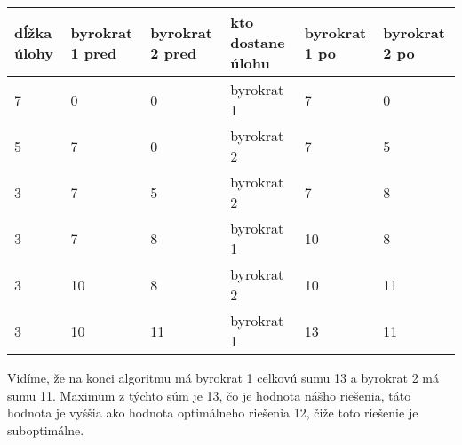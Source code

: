 \documentclass[a4paper]{article}
\begin{document}
\begin{table}[!h]
	\begin{tabular}{|p{}|p{}|p{}|p{}|p{}|p{}|}
		\hline
		dĺžka úlohy & byrokrat 1 pred & byrokrat 2 pred & kto dostane úlohu & byrokrat 1 po & byrokrat 2 po \\ \hline
		7           & 0               & 0               & byrokrat 1        & 7             & 0             \\ \hline
		5           & 7               & 0               & byrokrat 2        & 7             & 5             \\ \hline
		3           & 7               & 5               & byrokrat 2        & 7             & 8             \\ \hline
		3           & 7               & 8               & byrokrat 1        & 10            & 8             \\ \hline
		3           & 10              & 8               & byrokrat 2        & 10            & 11            \\ \hline
		3           & 10              & 11              & byrokrat 1        & 13            & 11            \\ \hline
	\end{tabular}
\end{table}
Vidíme, že na konci algoritmu má byrokrat 1 celkovú sumu 13 a byrokrat 2 má sumu 11. Maximum z týchto súm je 13, čo je hodnota nášho riešenia, táto hodnota je vyššia ako hodnota optimálneho riešenia 12, čiže toto riešenie je suboptimálne.
\\
\end{document}
